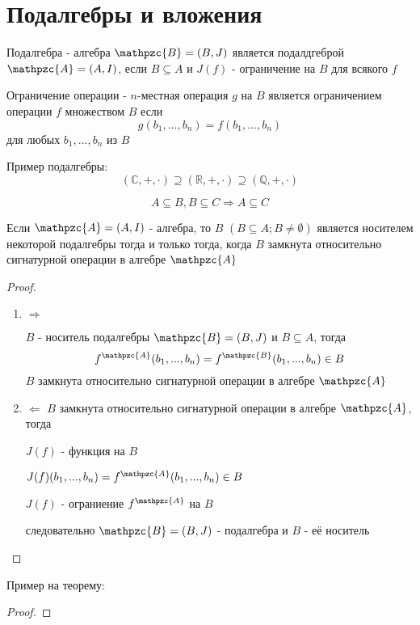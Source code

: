 \documentclass[../main/document.tex]{subfiles}
\begin{document}
\section{Подалгебры и вложения}
\begin{dfn}
Подалгебра - алгебра $\mathpzc{B}=(B,J)$ является подалдгеброй $\mathpzc{A}=(A,I)$, если $B\subseteq A$ и $J(f)$ - ограничение на $B$ для всякого $f$
\end{dfn}
\begin{dfn}
Ограничение операции - $n$-местная операция $g$ на $B$ является ограничением операции $f$ множеством $B$ если 
$$g(b_1,...,b_n)=f(b_1,...,b_n)$$
для любых $b_1,...,b_n$ из $B$
\end{dfn}
\begin{exm}
Пример подалгебры:
$$(\mathbb{C},+,\cdot)\supseteq (\mathbb{R},+,\cdot)\supseteq (\mathbb{Q},+,\cdot)$$
\end{exm}
\begin{cnsq}
$$A\subseteq B, B\subseteq C \Rightarrow A\subseteq C$$
\end{cnsq}
\begin{thm}
Если $\mathpzc{A}=(A,I)$ - алгебра, то $B$ $(B\subseteq A; B\neq \emptyset)$ является носителем некоторой подалгебры тогда и только тогда, когда $B$ замкнута относительно сигнатурной операции в алгебре $\mathpzc{A}$
\begin{proof}
\begin{enumerate}
\item $\Rightarrow$

$B$ - носитель подалгебры $\mathpzc{B}=(B,J)$ и $B\subseteq A$, тогда
$$f^{\mathpzc{A}}(b_1,...,b_n)=f^{\mathpzc{B}}(b_1,...,b_n)\in B$$
$B$ замкнута относительно сигнатурной операции в алгебре $\mathpzc{A}$
\item $\Leftarrow$
$B$ замкнута относительно сигнатурной операции в алгебре $\mathpzc{A}$, тогда

$J(f)$ - функция на $B$

$J(f)(b_1,...,b_n)=f^{\mathpzc{A}}(b_1,...,b_n)\in B$

$J(f)$ - ограниение $f^{\mathpzc{A}}$  на $B$

следовательно $\mathpzc{B}=(B,J)$ - подалгебра и $B$ - её носитель
\end{enumerate}
\end{proof}
\end{thm}
\begin{exm}
Пример на теорему:

\end{exm}

\begin{thm}
\begin{proof}

\end{proof}
\end{thm}
\end{document}
